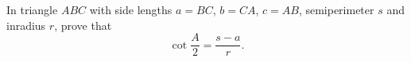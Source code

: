In triangle $ABC$ with side lengths $a=BC$, $b=CA$, $c=AB$, semiperimeter $s$ and inradius $r$, prove that
\[\cot\dfrac A2=\dfrac{s-a}{r}.\]
